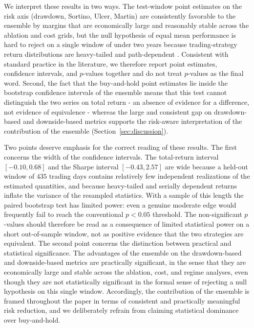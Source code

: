 \documentclass{ieeeaccess}
\newcommand{\TRtestCIlow}{\ensuremath{-0.10}}
\newcommand{\TRtestCIhigh}{\ensuremath{0.68}}
\newcommand{\ShtestCIlow}{\ensuremath{-0.43}}
\newcommand{\ShtestCIhigh}{\ensuremath{2.57}}
\newcommand{\OOSDays}{\ensuremath{435}}
\begin{document}
We interpret these results in two ways. The test-window point estimates on the risk axis (drawdown, Sortino, Ulcer, Martin) are consistently favorable to the ensemble by margins that are economically large and reasonably stable across the ablation and cost grids, but the null hypothesis of equal mean performance is hard to reject on a single window of under two years because trading-strategy return distributions are heavy-tailed and path-dependent \cite{politis1994,bailey2014}. Consistent with standard practice in the literature, we therefore report point estimates, confidence intervals, and $p$-values together and do not treat $p$-values as the final word. Second, the fact that the buy-and-hold point estimates lie inside the bootstrap confidence intervals of the ensemble means that this test cannot distinguish the two series on total return - an absence of evidence for a difference, not evidence of equivalence - whereas the large and consistent gap on drawdown-based and downside-based metrics supports the risk-aware interpretation of the contribution of the ensemble (Section~\ref{sec:discussion}).

Two points deserve emphasis for the correct reading of these results. The first concerns the width of the confidence intervals. The total-return interval $[\TRtestCIlow, \TRtestCIhigh]$ and the Sharpe interval $[\ShtestCIlow, \ShtestCIhigh]$ are wide because a held-out window of \OOSDays{} trading days contains relatively few independent realizations of the estimated quantities, and because heavy-tailed and serially dependent returns inflate the variance of the resampled statistics. With a sample of this length the paired bootstrap test has limited power: even a genuine moderate edge would frequently fail to reach the conventional $p < 0.05$ threshold. The non-significant $p$-values should therefore be read as a consequence of limited statistical power on a short out-of-sample window, not as positive evidence that the two strategies are equivalent. The second point concerns the distinction between practical and statistical significance. The advantages of the ensemble on the drawdown-based and downside-based metrics are practically significant, in the sense that they are economically large and stable across the ablation, cost, and regime analyses, even though they are not statistically significant in the formal sense of rejecting a null hypothesis on this single window. Accordingly, the contribution of the ensemble is framed throughout the paper in terms of consistent and practically meaningful risk reduction, and we deliberately refrain from claiming statistical dominance over buy-and-hold.
\end{document}
